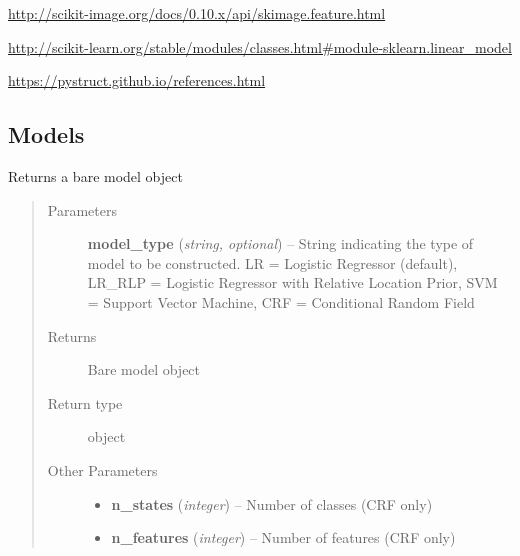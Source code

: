 \documentclass[letterpaper,10pt,english]{sphinxmanual}
\begin{document}


\href{http://scikit-image.org/docs/0.10.x/api/skimage.feature.html}{http://scikit-image.org/docs/0.10.x/api/skimage.feature.html}






\href{http://scikit-learn.org/stable/modules/classes.html\#module-sklearn.linear\_model}{http://scikit-learn.org/stable/modules/classes.html\#module-sklearn.linear\_model}






\href{https://pystruct.github.io/references.html}{https://pystruct.github.io/references.html}




\subsection{Models}
\label{classification:models}\label{classification:module-flamingo.classification.models}

\begin{fulllineitems}
\label{classification:flamingo.classification.models.get_model}
Returns a bare model object
\begin{quote}\begin{description}
\item[{Parameters}] \leavevmode
\textbf{model\_type} (\emph{string, optional}) -- String indicating the type of model to be constructed.
LR = Logistic Regressor (default), LR\_RLP = Logistic Regressor with Relative Location Prior, SVM = Support Vector Machine, CRF = Conditional Random Field

\item[{Returns}] \leavevmode
Bare model object

\item[{Return type}] \leavevmode
object

\item[{Other Parameters}] \leavevmode\begin{itemize}
\item {} 
\textbf{n\_states} (\emph{integer}) --
Number of classes (CRF only)

\item {} 
\textbf{n\_features} (\emph{integer}) --
Number of features (CRF only)

\end{itemize}

\end{description}\end{quote}

\end{fulllineitems}
\end{document}
